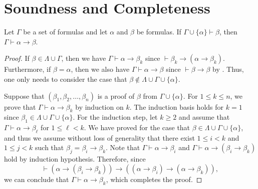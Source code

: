 \section{Soundness and Completeness}

\begin{theorem}
  \label{thm:deduction}
  Let $\Gamma$ be a set of formulas and let $\alpha$ and $\beta$ be formulas.
  If $\Gamma \cup \{\alpha\} \vdash \beta$, then
  $\Gamma \vdash \alpha \to \beta$.
\end{theorem}
\begin{proof}
  If $\beta \in \Lambda \cup \Gamma$, then we have
  $\Gamma \vdash \alpha \to \beta_k$ since
  $\vdash \beta_k \to (\alpha \to \beta_k)$.
  Furthermore, if $\beta = \alpha$, then we also have
  $\Gamma \vdash \alpha \to \beta$ since $\vdash \beta \to \beta$ by
  .
  Thus, one only needs to consider the case that
  $\beta \notin \Lambda \cup \Gamma \cup \{\alpha\}$.

  Suppose that $(\beta_1, \beta_2, \dots, \beta_n)$ is a proof of $\beta$ from
  $\Gamma \cup \{\alpha\}$.
  For $1 \leq k \leq n$, we prove that $\Gamma \vdash \alpha \to \beta_k$ by
  induction on $k$.
  The induction basis holds for $k = 1$ since
  $\beta_1 \in \Lambda \cup \Gamma \cup \{\alpha\}$.
  For the induction step, let $k \geq 2$ and assume that
  $\Gamma \vdash \alpha \to \beta_\ell$ for $1 \leq \ell < k$.
  We have proved for the case that
  $\beta \in \Lambda \cup \Gamma \cup \{\alpha\}$, and thus we assume without
  loss of generality that there exist $1 \leq i < k$ and $1 \leq j < k$
  such that $\beta_j = \beta_i \to \beta_k$.
  Note that $\Gamma \vdash \alpha \to \beta_i$ and
  $\Gamma \vdash \alpha \to (\beta_i \to \beta_k)$
  hold by induction hypothesis.
  Therefore, since
  \begin{equation*}
    \vdash (\alpha \to (\beta_i \to \beta_k)) \to
    ((\alpha \to \beta_i) \to (\alpha \to \beta_k)),
  \end{equation*}
  we can conclude that $\Gamma \vdash \alpha \to \beta_k$,
  which completes the proof.
\end{proof}